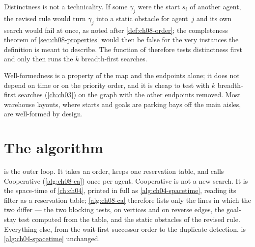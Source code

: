 Distinctness is not a technicality. If some $\gamma_j$ were the start $s_i$ of another
agent, the revised rule would turn $\gamma_j$ into a static obstacle for agent~$j$ and its
own search would fail at once, as noted after \cref{def:ch08-order}; the completeness
theorem of \cref{sec:ch08-properties} would then be false for the very instances the
definition is meant to describe. The function  of
 therefore tests distinctness first and only then runs
the $k$ breadth-first searches.

Well-formedness is a property of the map and the endpoints alone; it does not depend on
time or on the priority order, and it is cheap to test with $k$ breadth-first searches
(\cref{ch:ch03}) on the graph with the other endpoints removed. Most warehouse layouts,
where starts and goals are parking bays off the main aisles, are well-formed by design.

\section{The algorithm}
\label{sec:ch08-algorithm}

 is the outer loop. It takes an order, keeps one reservation table, and
calls Cooperative \astar (\cref{alg:ch08-ca}) once per agent. Cooperative \astar is not a
new search. It is the space-time \astar of \cref{ch:ch04}, printed in full as
\cref{alg:ch04-spacetime}, reading its filter as a reservation table;
\cref{alg:ch08-ca} therefore lists only the lines in which the two differ ---
the two blocking tests, on vertices and on reverse edges, the goal-stay test
computed from the table, and the static obstacles of the revised rule. Everything
else, from the wait-first successor order to the duplicate detection, is
\cref{alg:ch04-spacetime} unchanged.

\begin{algorithm}[htb]
\caption{Prioritized planning}
\label{alg:ch08-pp}
\end{algorithm}

